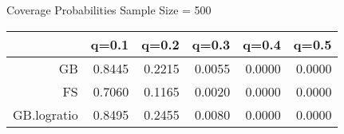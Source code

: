 

 Coverage Probabilities Sample Size =  500 

\begin{tabular}{rrrrrr}
  \hline
 & q=0.1 & q=0.2 & q=0.3 & q=0.4 & q=0.5 \\ 
  \hline
GB & 0.8445 & 0.2215 & 0.0055 & 0.0000 & 0.0000 \\ 
  FS & 0.7060 & 0.1165 & 0.0020 & 0.0000 & 0.0000 \\ 
  GB.logratio & 0.8495 & 0.2455 & 0.0080 & 0.0000 & 0.0000 \\ 
   \hline
\end{tabular}
\vspace{0.2in}
